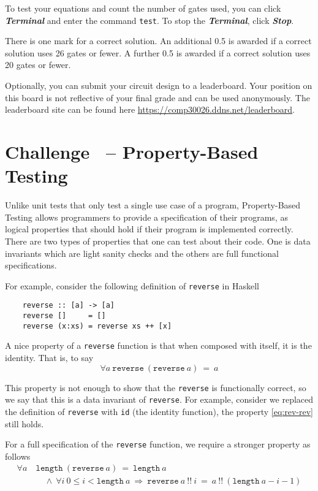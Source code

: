 \documentclass[11pt]{article}
\newcommand{\impl}{\mathbin{\Rightarrow}}
\newcounter{challenge}
\newcounter{task}
\renewcommand{\thechallenge}{Challenge~\arabic{challenge}}
\newcommand{\challenge}[1]{
    \setcounter{task}{0}
    \setcounter{equation}{0}
    \refstepcounter{challenge}
    \section*{\thechallenge{} -- #1}
}
\begin{document}
To test your equations and count the number of gates used, you can click
{\bf\emph{Terminal}}
and enter the command \texttt{test}. To stop the {\bf\emph{Terminal}}, click {\bf\emph{Stop}}. 

There is one mark for a correct solution. 
An additional 0.5 is awarded if a correct solution uses 26 gates or fewer.
A further 0.5 is awarded if a correct solution uses 20 gates or fewer.

Optionally, you can submit your circuit design to a leaderboard. 
Your position on this board is not reflective of your final grade and can be used anonymously.
The leaderboard site can be found here \url{https://comp30026.ddns.net/leaderboard}.

\pagebreak

\challenge{Property-Based Testing} \label{ch:property-based-testing} 
Unlike unit tests that only test a single use case of a program, 
Property-Based Testing allows programmers to provide a specification of their programs, 
as logical properties that should hold if their program is implemented correctly. 
There are two types of properties that one can test about their code. 
One is data invariants which are light sanity checks and the others are full functional 
specifications.

For example, consider the following definition of \texttt{reverse} in Haskell
\begin{verbatim}
    reverse :: [a] -> [a]
    reverse []     = []
    reverse (x:xs) = reverse xs ++ [x]
\end{verbatim}

A nice property of a \texttt{reverse} function is that when composed with itself, it is the identity.
That is, to say
\begin{equation}
    \label{eq:rev-rev} \forall a\ \texttt{reverse}\ (\texttt{reverse}\ a)\ =\ a
\end{equation}

This property is not enough to show that the \texttt{reverse} is functionally correct, so we say that this is
a data invariant of \texttt{reverse}. For example, consider we replaced the definition of \texttt{reverse}
with \texttt{id} (the identity function), the property \eqref{eq:rev-rev} still holds.

For a full specification of the \texttt{reverse} function, we require a stronger property as follows
\begin{equation}
\begin{aligned}
    \forall a& \ \texttt{length}\ (\texttt{reverse}\ a)\ =\ \texttt{length}\ a \\ 
    & \quad\ \land\ \forall i\ 0 \leq i < \texttt{length}\ a\ \impl\ \texttt{reverse}\ a\ \texttt{!!}\ i\ =\ a\ \texttt{!!}\ (\texttt{length}\ a - i - 1) \\
\end{aligned}
\end{equation}
\end{document}
